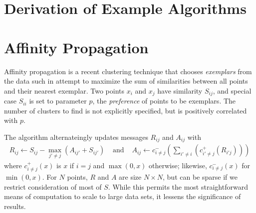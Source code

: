 \documentclass{article}
\newcommand{\cpos}[2]{c^{+}_{#1 \neq #2}}
\newcommand{\cneg}[2]{c^{-}_{#1 \neq #2}}
\newcommand{\respo}[2]{R_{#1#2}}
\newcommand{\avail}[2]{A_{#1#2}}
\newcommand{\simil}[2]{S_{#1#2}}
\begin{document}

\section{Derivation of Example Algorithms}

\section{Affinity Propagation}


Affinity propagation \cite{affinity} is a recent clustering technique
that chooses {\em exemplars} from the data such in attempt to maximize
the sum of similarities between all points and their nearest exemplar.
Two points $x_i$ and $x_j$ have similarity $\simil{i}{j}$, and special
case $\simil{i}{i}$ is set to parameter $p$, the {\em preference} of
points to be exemplars.  The number of clusters to find is not
explicitly specified, but is positively correlated with $p$.

The algorithm alternateingly updates messages $\respo{i}{j}$ and
$\avail{i}{j}$ with
\[ \begin{array}{rcl}
  \respo{i}{j} \gets \simil{i}{j} - \max_{j' \neq j} (\avail{i}{j'} + \simil{i}{j'})
  & \text{ and } &
  \avail{i}{j} \gets \cneg{i}{j}( \sum_{i' \neq i} ( \cpos{i'}{j}(\respo{i'}{j}) ) )
\end{array} \]
where $\cpos{i}{j}(x)$ is $x$ if $i = j$ and $\max(0,x)$
otherwise; likewise, $\cneg{i}{j}(x)$ for $\min(0,x)$.  For $N$
points, $R$ and $A$ are size $N \times N$, but can be sparse if we
restrict consideration of most of $S$.  While this permits the most
straightforward means of computation to scale to large data sets, it
lessens the significance of results.
\end{document}
